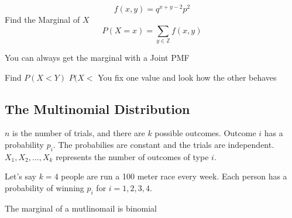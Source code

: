 \begin{example}
    \[
        f(x,y)=q^{x+y-2}p^2
    \]
    Find the Marginal of $X$
    \solution
    \[
        P(X=x)= \sum_{y\in\mathbb Z} f(x,y)
    \]
\end{example}
You can always get the marginal with a Joint PMF

\begin{example}
    Find $P(X<Y)$
    \solution
    $P(X<$
    You fix one value and look how the other behaves
\end{example}

\subsection{The Multinomial Distribution}
\newcommand{\mult}{\textup{Mult}}
$n$ is the number of trials, and there are $k$ possible outcomes. Outcome $i$ has a probability $p_i$. The probabilies are constant and the trials are independent. $X_1,X_2,...,X_k$ represents the number of outcomes of type $i$. 

Let's say $k=4$ people are run a 100 meter race every week. Each person has a probability of winning $p_i$ for $i=1,2,3,4$. 




The marginal of a mutlinomail is binomial
